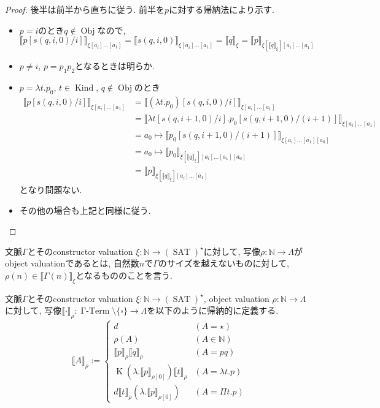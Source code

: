 \documentclass[12pt, titlepage]{ltjsarticle}
\DeclareMathOperator{\Obj}{Obj}
\DeclareMathOperator{\Kind}{Kind}
\DeclareMathOperator{\SAT}{SAT}
\DeclareMathOperator{\GTerm}{\Gamma-Term}
\DeclareMathOperator{\K}{K}
\newcommand{\iprt}[2]{\llbracket {#1} \rrbracket_ {#2}}
\begin{document}
\begin{proof}
 後半は前半から直ちに従う. 前半を$p$に対する帰納法により示す.
 \begin{itemize}
  \item $p = i$のとき$q \notin \Obj$なので,
        \[
        \iprt{p [s (q, i, 0)/i]}{\xi[a_i]\ldots[a_1]} = \iprt{s (q, i, 0)}{\xi[a_i]\ldots[a_1]} = \iprt{q}{\xi} = \iprt{p}{\xi[\iprt{q}{\xi}][a_i]\ldots[a_1]}
        \]
  \item $p \neq i$, $p = p_1 p_2$となるときは明らか.
  \item $p = \lambda t. p_0$, $t \in \Kind$, $q \notin \Obj$のとき
        \begin{align*}
        \iprt{p [s (q, i, 0)/i]}{\xi[a_i]\ldots[a_1]} &= \iprt{(\lambda t. p_0) [s (q, i, 0)/i]}{\xi[a_i]\ldots[a_1]} \\
         &= \iprt{\lambda t[s (q, i+1, 0)/i]. p_0[s (q, i+1, 0)/(i+1)]}{\xi[a_i]\ldots[a_1]} \\
         &= a_0 \mapsto \iprt{p_0[s (q, i+1, 0)/(i+1)]}{\xi[a_i]\ldots[a_1][a_0]} \\
         &= a_0 \mapsto \iprt{p_0}{\xi[\iprt{q}{\xi}][a_i]\ldots[a_1][a_0]} \\
         &= \iprt{p}{\xi[\iprt{q}{\xi}][a_i]\ldots[a_1]}
        \end{align*}
        となり問題ない.
  \item その他の場合も上記と同様に従う.
 \end{itemize}
\end{proof}

\begin{defn}
 文脈$\Gamma$とそのconstructor valuation $\xi : \mathbb{N} \rightarrow (\SAT)^\star$に対して, 写像$\rho : \mathbb{N} \rightarrow \Lambda$がobject valuationであるとは, 自然数$n$で$\Gamma$のサイズを越えないものに対して, $\rho (n) \in \iprt{\Gamma(n)}{\xi}$となるもののことを言う.
\end{defn}

\begin{defn}
 文脈$\Gamma$とそのconstructor valuation $\xi : \mathbb{N} \rightarrow (\SAT)^\star$, object valuation $\rho : \mathbb{N} \rightarrow \Lambda$に対して, 写像$\iprt{\cdot}{\rho} : \GTerm \setminus \{\square\} \rightarrow \Lambda$を以下のように帰納的に定義する.
\[
 \iprt{A}{\rho} := \begin{cases}
    d & (A = \star) \\
    \rho (A) & (A \in \mathbb{N}) \\
    \iprt{p}{\rho} \iprt{q}{\rho} & (A = p q) \\
    \K (\lambda . \iprt{p}{\rho[0]}) \iprt{t}{\rho} & (A = \lambda t. p) \\
    d \iprt{t}{\rho} (\lambda . \iprt{p}{\rho[0]}) & (A = \Pi t. p)
  \end{cases}
\]
\end{defn}
\end{document}
